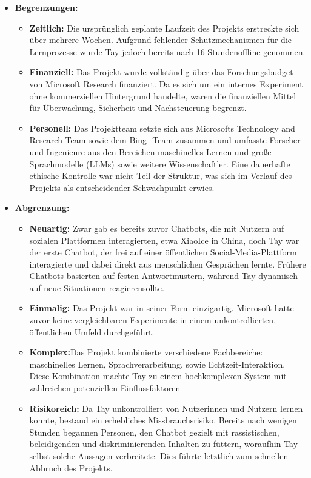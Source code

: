 \documentclass{article}
\begin{document}
\begin{itemize}
  \item \textbf{Begrenzungen:}
  \begin{itemize}
    \item \textbf{Zeitlich:} Die ursprünglich geplante Laufzeit des Projekts erstreckte sich über mehrere Wochen. 
    Aufgrund fehlender Schutzmechanismen für die Lernprozesse wurde Tay jedoch bereits nach 16 Stundenoffline genommen.
    \item \textbf{Finanziell:} Das Projekt wurde vollständig über das Forschungsbudget von Microsoft Research finanziert. 
    Da es sich um ein internes Experiment ohne kommerziellen Hintergrund handelte, waren die finanziellen Mittel für Überwachung, Sicherheit und Nachsteuerung begrenzt.
    \item \textbf{Personell:} Das Projektteam setzte sich aus Microsofts Technology and Research-Team sowie dem Bing- Team zusammen und 
    umfasste Forscher und Ingenieure aus den Bereichen maschinelles Lernen und große Sprachmodelle (LLMs) sowie weitere Wissenschaftler. 
    Eine dauerhafte ethische Kontrolle war nicht Teil der Struktur, was sich im Verlauf des Projekts als entscheidender Schwachpunkt erwies.
  \end{itemize}

  \item \textbf{Abgrenzung:}
  \begin{itemize}
    \item \textbf{Neuartig:} Zwar gab es bereits zuvor Chatbots, die mit Nutzern auf sozialen Plattformen interagierten, 
    etwa XiaoIce in China, doch Tay war der erste Chatbot, der frei auf einer öffentlichen Social-Media-Plattform interagierte 
    und dabei direkt aus menschlichen Gesprächen lernte. Frühere Chatbots basierten auf festen Antwortmustern, 
    während Tay dynamisch auf neue Situationen reagierensollte.
    \item \textbf{Einmalig:} Das Projekt war in seiner Form einzigartig. Microsoft hatte zuvor keine vergleichbaren Experimente in einem unkontrollierten, öffentlichen Umfeld durchgeführt.
    \item \textbf{Komplex:}Das Projekt kombinierte verschiedene Fachbereiche: maschinelles Lernen, Sprachverarbeitung, 
    sowie Echtzeit-Interaktion. Diese Kombination machte Tay zu einem hochkomplexen System mit zahlreichen potenziellen Einflussfaktoren
    \item \textbf{Risikoreich:} Da Tay unkontrolliert von Nutzerinnen und Nutzern lernen konnte, bestand ein erhebliches Missbrauchsrisiko. 
    Bereits nach wenigen Stunden begannen Personen, den Chatbot gezielt mit rassistischen, beleidigenden und diskriminierenden Inhalten zu füttern, 
    woraufhin Tay selbst solche Aussagen verbreitete. Dies führte letztlich zum schnellen Abbruch des Projekts.
  \end{itemize}


\end{itemize}
\end{document}
